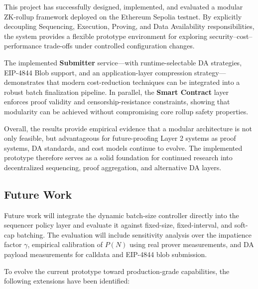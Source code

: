 This project has successfully designed, implemented, and evaluated a modular ZK-rollup framework deployed on the Ethereum Sepolia testnet. By explicitly decoupling Sequencing, Execution, Proving, and Data Availability responsibilities, the system provides a flexible prototype environment for exploring security--cost--performance trade-offs under controlled configuration changes.

The implemented \textbf{Submitter} service—with runtime-selectable DA strategies, EIP-4844 Blob support, and an application-layer compression strategy—demonstrates that modern cost-reduction techniques can be integrated into a robust batch finalization pipeline. In parallel, the \textbf{Smart Contract} layer enforces proof validity and censorship-resistance constraints, showing that modularity can be achieved without compromising core rollup safety properties.

Overall, the results provide empirical evidence that a modular architecture is not only feasible, but advantageous for future-proofing Layer 2 systems as proof systems, DA standards, and cost models continue to evolve. The implemented prototype therefore serves as a solid foundation for continued research into decentralized sequencing, proof aggregation, and alternative DA layers.

\subsection{Future Work}
Future work will integrate the dynamic batch-size controller directly into the sequencer policy layer and evaluate it against fixed-size, fixed-interval, and soft-cap batching. The evaluation will include sensitivity analysis over the impatience factor \(\gamma\), empirical calibration of \(P(N)\) using real prover measurements, and DA payload measurements for calldata and EIP-4844 blob submission.

\vspace{12pt}

To evolve the current prototype toward production-grade capabilities, the following extensions have been identified:

